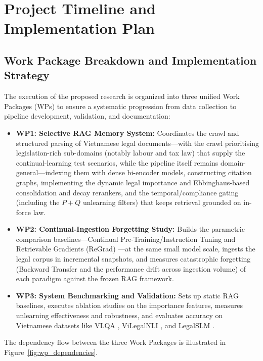 \section{Project Timeline and Implementation Plan}

\subsection{Work Package Breakdown and Implementation Strategy}
The execution of the proposed research is organized into three unified Work Packages (WPs) to ensure a systematic progression from data collection to pipeline development, validation, and documentation:
\begin{itemize}
    \item \textbf{WP1: Selective RAG Memory System:} Coordinates the crawl and structured parsing of Vietnamese legal documents---with the crawl prioritising legislation-rich sub-domains (notably labour and tax law) that supply the continual-learning test scenarios, while the pipeline itself remains domain-general---indexing them with dense bi-encoder models, constructing citation graphs, implementing the dynamic legal importance and Ebbinghaus-based consolidation and decay rerankers, and the temporal/compliance gating (including the $P{+}Q$ unlearning filters) that keeps retrieval grounded on in-force law.
    \item \textbf{WP2: Continual-Ingestion Forgetting Study:} Builds the parametric comparison baselines---Continual Pre-Training/Instruction Tuning and Retrievable Gradients (ReGrad) \parencite{su2026retrievablegradientscontinualposttraining}---at the same small model scale, ingests the legal corpus in incremental snapshots, and measures catastrophic forgetting (Backward Transfer and the performance drift across ingestion volume) of each paradigm against the frozen RAG framework.
    \item \textbf{WP3: System Benchmarking and Validation:} Sets up static RAG baselines, executes ablation studies on the importance features, measures unlearning effectiveness and robustness, and evaluates accuracy on Vietnamese datasets like VLQA \parencite{nguyen2025vlqacomprehensivelargehighquality}, ViLegalNLI \parencite{duong2026vilegalnlinaturallanguageinference}, and LegalSLM \parencite{le-etal-2025-overview}.
\end{itemize}

The dependency flow between the three Work Packages is illustrated in Figure~\ref{fig:wp_dependencies}.

